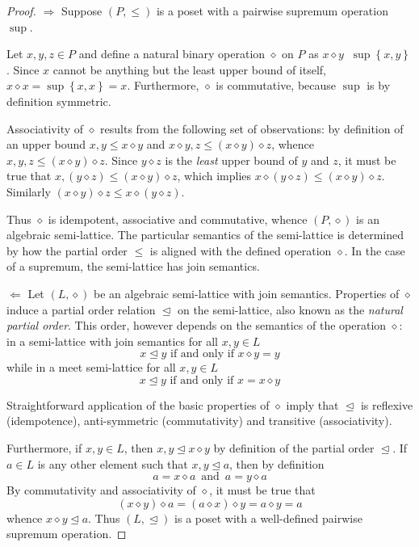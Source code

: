 \documentclass[a4paper]{article}
\newcommand{\obj}[1]{{\left\{ #1 \right \}}}
\newcommand{\brac}[1]{{\left ( #1 \right )}}
\newcommand{\defn}{\mathop{\overset{\Delta}{=}}\nolimits}
\begin{document}
\begin{proof}
$\Rightarrow$ Suppose $(P,\leq)$ is a poset with a pairwise supremum operation $\sup$.

Let $x,y,z\in P$ and define a natural binary operation $\diamond$ on $P$ as $x\diamond y \defn \sup\obj{x,y}$. Since $x$ cannot be anything but the least upper bound of itself, $x\diamond x=\sup\obj{x,x}=x$. Furthermore, $\diamond$ is commutative, because $\sup$ is by definition symmetric.

Associativity of $\diamond$ results from the following set of observations: by definition of an upper bound $x,y\leq x\diamond y$ and $x\diamond y,z \leq \brac{x\diamond y}\diamond z$, whence $x,y,z \leq \brac{x\diamond y}\diamond z$. Since $y\diamond z$ is the \emph{least} upper bound of $y$ and $z$, it must be true that $x, (y\diamond z) \leq \brac{x\diamond y}\diamond z$, which implies $x\diamond\brac{y\diamond z} \leq \brac{x\diamond y}\diamond z$. Similarly $\brac{x\diamond y}\diamond z\leq x\diamond\brac{y\diamond z}$.

Thus $\diamond$ is idempotent, associative and commutative, whence $(P,\diamond)$ is an algebraic semi-lattice. The particular semantics of the semi-lattice is determined by how the partial order $\leq$ is aligned with the defined operation $\diamond$. In the case of a supremum, the semi-lattice has join semantics.

$\Leftarrow$ Let $(L,\diamond)$ be an algebraic semi-lattice with join semantics. Properties of $\diamond$ induce a partial order relation $\trianglelefteq$ on the semi-lattice, also known as the \emph{natural partial order}. This order, however depends on the semantics of the operation $\diamond$: in a semi-lattice with join semantics for all $x,y\in L$ \[x \trianglelefteq y\text{ if and only if } x\diamond y = y\] while in a meet semi-lattice for all $x,y\in L$ \[x \trianglelefteq y\text{ if and only if } x = x\diamond y\]
	
Straightforward application of the basic properties of $\diamond$ imply that $\trianglelefteq$ is reflexive (idempotence), anti-symmetric (commutativity) and transitive (associativity).

Furthermore, if $x,y\in L$, then $x,y\trianglelefteq x\diamond y$ by definition of the partial order $\trianglelefteq$. If $a\in L$ is any other element such that $x,y\trianglelefteq a$, then by definition \[a = x \diamond a\,\text{ and }\, a = y\diamond a\] By commutativity and associativity of $\diamond$, it must be true that \[(x\diamond y)\diamond a = (a\diamond x) \diamond y = a\diamond y = a\] whence $x\diamond y\trianglelefteq a$. Thus $(L,\trianglelefteq)$ is a poset with a well-defined pairwise supremum operation.

\end{proof}
\end{document}
